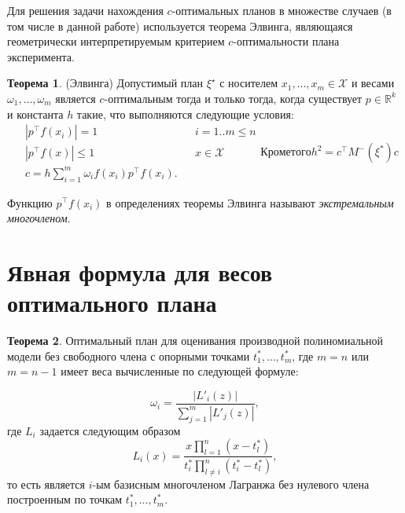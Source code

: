 \documentclass[specialist,
               substylefile = spbu.rtx,
               subf,href,colorlinks=true, 12pt]{disser}
\theoremstyle{definition}
\newtheorem{theorem}{Теорема}
\newcommand\abs[1]{\left\lvert#1\right\rvert}
\begin{document}
  Для решения задачи нахождения $c$-оптимальных планов в множестве случаев (в том числе в данной работе) используется теорема Элвинга, являющаяся геометрически интерпретируемым критерием $c$-оптимальности плана эксперимента.
  \begin{theorem}
  \label{th:elfving}
  (Элвинга) \cite{elfving1952}
  Допустимый план $\xi^\star$ с носителем $x_1, \ldots, x_m \in \mathcal{X}$ и весами $\omega_1, \ldots, \omega_m$ является $c$-оптимальным тогда и только тогда, когда существует $p \in \mathbb{R}^k$ и константа $h$ такие, что выполняются следующие условия:
  \begin{subequations}
  \label{eq:elfving}
  \begin{align}
	&\abs{p^\top f(x_i)} = 1 &&i=1..m \leqslant n \label{eq:elfving:eq1} \\
	&\abs{p^\top f(x)} \leqslant 1  &&x \in \mathcal{X} \label{eq:elfving:eq2} \\
	&c = h \sum_{i=1}^m \omega_i f(x_i) p^\top f(x_i) \label{eq:elfving:eq3}.
  \end{align}
  Кроме того
  \begin{equation*}
  	h^2 = c^\top M^{-}(\xi^{*})c
  \end{equation*}
  \end{subequations}
  \end{theorem}
	Функцию $p^\top f(x_i)$ в определениях теоремы Элвинга называют \textit{экстремальным многочленом}.
	
	\section{Явная формула для весов оптимального плана}
	
	\begin{theorem}
	\label{th:weights}
	Оптимальный план для оценивания производной полиномиальной модели без свободного члена с опорными точками $t_1^*, \ldots, t_m^*$, где $m=n$ или $m=n-1$ имеет веса вычисленные по следующей формуле:	
	
	\begin{equation}
	\label{eq:weights}
		\omega_i = \frac{\abs{L'_i(z)}}{\sum_{j=1}^m \abs{L'_j(z)}},
	\end{equation}
	где $L_i$ задается следующим образом
	\begin{equation}
		\label{eq:lagr}
		L_{i}(x) = \frac{x \prod_{l=1}^n (x - t_l^*)}{t_i^* \prod_{l \neq i}^n (t_i^* - t_l^*)},
	\end{equation}	
	то есть является $i$-ым базисным многочленом Лагранжа без нулевого члена построенным по точкам $t_1^*, \ldots, t_m^*$.
	\end{theorem}
	
\end{document}
